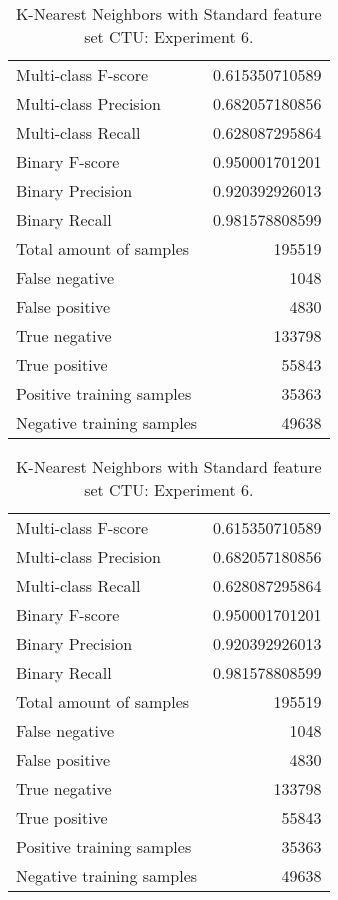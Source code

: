 \begin{table}[H]
\begin{minipage}{0.5\textwidth}
\caption{K-Nearest Neighbors with Standard feature set CTU: Experiment 5.}
\centering
\begin{tabular}{l r}
\toprule
Multi-class F-score & 0.615350710589 \\
Multi-class Precision & 0.682057180856 \\
Multi-class Recall & 0.628087295864 \\
\midrule
Binary F-score & 0.950001701201 \\
Binary Precision & 0.920392926013 \\
Binary Recall & 0.981578808599 \\
\midrule
Total amount of samples & 195519 \\
False negative & 1048 \\
False positive & 4830 \\
True negative & 133798 \\
True positive & 55843 \\
\midrule
Positive training samples & 35363 \\
Negative training samples & 49638 \\
\bottomrule
\end{tabular}
\end{minipage}
\hfillx
\begin{minipage}{0.5\textwidth}
\caption{K-Nearest Neighbors with Standard feature set CTU: Experiment 6.}
\centering
\begin{tabular}{l r}
\toprule
Multi-class F-score & 0.615350710589 \\
Multi-class Precision & 0.682057180856 \\
Multi-class Recall & 0.628087295864 \\
\midrule
Binary F-score & 0.950001701201 \\
Binary Precision & 0.920392926013 \\
Binary Recall & 0.981578808599 \\
\midrule
Total amount of samples & 195519 \\
False negative & 1048 \\
False positive & 4830 \\
True negative & 133798 \\
True positive & 55843 \\
\midrule
Positive training samples & 35363 \\
Negative training samples & 49638 \\
\bottomrule
\end{tabular}
\end{minipage}
\end{table}
